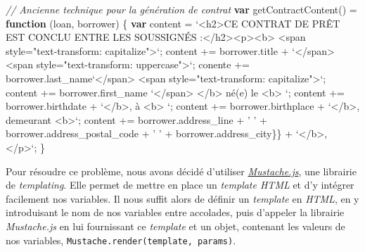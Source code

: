 \documentclass[12pt,a4paper]{article}
\newenvironment{Shaded}{}{}
\newcommand{\KeywordTok}[1]{\textcolor[rgb]{0.00,0.44,0.13}{\textbf{{#1}}}}
\newcommand{\StringTok}[1]{\textcolor[rgb]{0.25,0.44,0.63}{{#1}}}
\newcommand{\VerbatimStringTok}[1]{\textcolor[rgb]{0.25,0.44,0.63}{{#1}}}
\newcommand{\CommentTok}[1]{\textcolor[rgb]{0.38,0.63,0.69}{\textit{{#1}}}}
\newcommand{\VariableTok}[1]{\textcolor[rgb]{0.10,0.09,0.49}{{#1}}}
\newcommand{\OperatorTok}[1]{\textcolor[rgb]{0.40,0.40,0.40}{{#1}}}
\newcommand{\AttributeTok}[1]{\textcolor[rgb]{0.49,0.56,0.16}{{#1}}}
\newcommand{\NormalTok}[1]{{#1}}
\begin{document}
  \begin{Shaded}
  \begin{Highlighting}[]
  \CommentTok{// Ancienne technique pour la génération de contrat}
  \KeywordTok{var} \AttributeTok{getContractContent}\NormalTok{() }\OperatorTok{=} \KeywordTok{function} \NormalTok{(loan}\OperatorTok{,} \NormalTok{borrower) }\OperatorTok{\{}
    \KeywordTok{var} \NormalTok{content }\OperatorTok{=} \VerbatimStringTok{`<h2>CE CONTRAT DE PRÊT EST CONCLU}
  \VerbatimStringTok{    ENTRE LES SOUSSIGNÉS :</h2><p><b>}
  \VerbatimStringTok{    <span style="text-transform: capitalize">`}\OperatorTok{;}
    \NormalTok{content }\OperatorTok{+=} \VariableTok{borrower}\NormalTok{.}\AttributeTok{title} \OperatorTok{+} \VerbatimStringTok{`</span>}
  \VerbatimStringTok{   <span style="text-transform: uppercase">`}\OperatorTok{;}
    \NormalTok{conente }\OperatorTok{+=} \VariableTok{borrower}\NormalTok{.}\AttributeTok{last_name}\VerbatimStringTok{`</span>}
  \VerbatimStringTok{   <span style="text-transform: capitalize">`}\OperatorTok{;}
    \NormalTok{content }\OperatorTok{+=} \VariableTok{borrower}\NormalTok{.}\AttributeTok{first_name} \VerbatimStringTok{`</span>}
  \VerbatimStringTok{    </b> né(e) le <b> `}\OperatorTok{;}
    \NormalTok{content }\OperatorTok{+=} \VariableTok{borrower}\NormalTok{.}\AttributeTok{birthdate} \OperatorTok{+} \VerbatimStringTok{`</b>, à <b> `}\OperatorTok{;}
    \NormalTok{content }\OperatorTok{+=} \VariableTok{borrower}\NormalTok{.}\AttributeTok{birthplace} \OperatorTok{+} \VerbatimStringTok{`</b>, demeurant <b>`}\OperatorTok{;}
    \NormalTok{content }\OperatorTok{+=} \VariableTok{borrower}\NormalTok{.}\AttributeTok{address_line} \OperatorTok{+} \StringTok{' '}
      \OperatorTok{+} \VariableTok{borrower}\NormalTok{.}\AttributeTok{address_postal_code} \OperatorTok{+} \StringTok{' '}
      \OperatorTok{+}  \VariableTok{borrower}\NormalTok{.}\AttributeTok{address_city}\OperatorTok{\}}\NormalTok{\} }\OperatorTok{+} \VerbatimStringTok{`</b>, </p>`}\OperatorTok{;}
  \NormalTok{\}}
  \end{Highlighting}
  \end{Shaded}

  \bigskip

  Pour résoudre ce problème, nous avons décidé d'utiliser
  \href{https://github.com/janl/mustache.js}{\emph{Mustache.js}}, une
  librairie de \emph{templating}. Elle permet de mettre en place un
  \emph{template HTML} et d'y intégrer facilement nos variables. Il nous
  suffit alors de définir un \emph{template} en \emph{HTML}, en y
  introduisant le nom de nos variables entre accolades, puis d'appeler la
  librairie \emph{Mustache.js} en lui fournissant ce \emph{template} et un
  objet, contenant les valeurs de nos variables,
  \texttt{Mustache.render(template,\ params)}.
\end{document}
